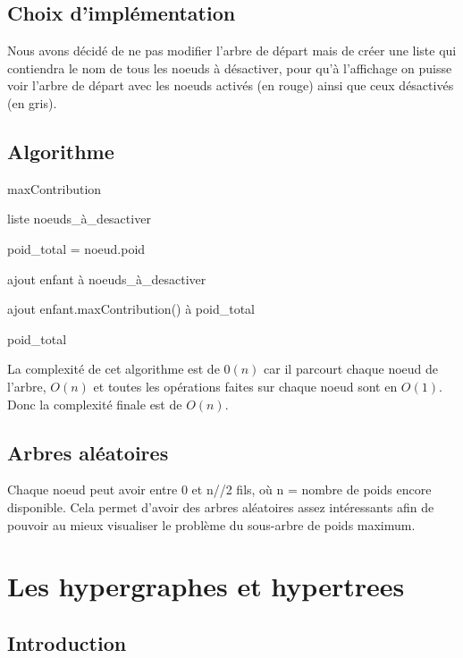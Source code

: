 \documentclass{article}
\begin{document}
	\subsection{Choix d'implémentation}

	Nous avons décidé de ne pas modifier l'arbre de départ mais de créer une liste qui contiendra le nom de tous les noeuds à désactiver, pour qu'à l'affichage on puisse voir l'arbre de départ avec les noeuds activés (en rouge) ainsi que ceux désactivés (en gris).
	
	
	\subsection{Algorithme}
	\begin{algorithm}[H]
	\caption{maxContribution}
	\begin{algorithmic}[1]
	\REQUIRE liste noeuds\_à\_desactiver

	\STATE poid\_total = noeud.poid
	
	
	\STATE ajout enfant à noeuds\_à\_desactiver

	\ELSE
	\STATE ajout enfant.maxContribution() à poid\_total
	
	\ENDIF	
	\ENDFOR

	\RETURN poid\_total

	\end{algorithmic}
	\end{algorithm}
	
	La complexité de cet algorithme est de $0(n)$ car il parcourt chaque noeud de l'arbre, $O(n)$ et toutes les opérations faites sur chaque noeud sont en $O(1)$. Donc la complexité finale est de $O(n)$.
		
	\subsection{Arbres aléatoires}
	Chaque noeud peut avoir entre 0 et n//2 fils, où n = nombre de poids encore disponible. Cela permet d'avoir des arbres aléatoires assez intéressants afin de pouvoir au mieux visualiser le problème du sous-arbre de poids maximum.

\section{Les hypergraphes et hypertrees}

	
	\subsection{Introduction}
	
\end{document}
